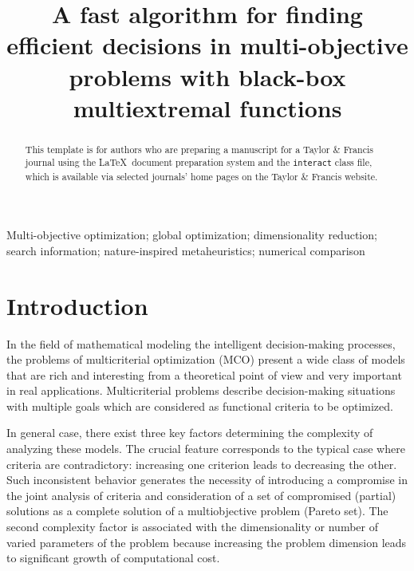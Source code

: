 \documentclass[]{interact}
\theoremstyle{plain}%
\theoremstyle{definition}
\theoremstyle{remark}
\begin{document}

\title{A fast algorithm for finding efficient decisions in multi-objective problems with black-box multiextremal functions}

\author{
}

\maketitle

\begin{abstract}
This template is for authors who are preparing a manuscript for a Taylor \& Francis journal using the \LaTeX\ document preparation system and the \texttt{interact} class file, which is available via selected journals' home pages on the Taylor \& Francis website.
\end{abstract}

\begin{keywords}
Multi-objective optimization; global optimization; dimensionality reduction; search information; nature-inspired metaheuristics; numerical comparison
\end{keywords}


\section{Introduction}

In the field of mathematical modeling the intelligent decision-making processes, the problems of multicriterial optimization (MCO) present a wide class of models that are rich and interesting from a theoretical point of view and very important in real applications. Multicriterial problems describe decision-making situations with multiple goals which are considered as functional criteria to be optimized.

In general case, there exist three key factors determining the complexity of analyzing these models. The crucial feature corresponds to the typical case where criteria are contradictory: increasing one criterion leads to decreasing the other. Such inconsistent behavior generates the necessity of introducing a compromise in the joint analysis of criteria and consideration of a set of compromised (partial) solutions as a complete solution of a multiobjective problem (Pareto set).
The second complexity factor is associated with the dimensionality or number of varied parameters of the problem because increasing the problem dimension leads to significant growth of computational cost. 
\end{document}
